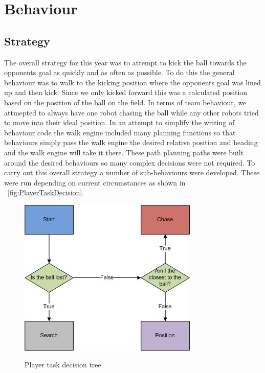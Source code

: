 \section{Behaviour}
\label{Behaviour}
\subsection{Strategy}
The overall strategy for this year was to attempt to kick the ball towards the opponents goal as quickly and as often as possible. To do this the general behaviour was to walk to the kicking position where the opponents goal was lined up and then kick. Since we only kicked forward this was a calculated position based on the position of the ball on the field. In terms of team behaviour, we attmepted to always have one robot chasing the ball while any other robots tried to move into their ideal position. In an attempt to simplify the writing of behaviour code the walk engine included many planning functions so that behaviours simply pass the walk engine the desired relative position and heading and the walk engine will take it there. These path planning paths were built around the desired behaviours so many complex decisions were not required. To carry out this overall strategy a number of sub-behaviours were developed. These were run depending on current circumstances as shown in ~\autoref{fig:PlayerTaskDecision}.

\begin{figure}[!h]
\begin{center}
   \leavevmode
    \scalebox{0.8} {\includegraphics{figs/FieldPlayerTaskDecision.jpg} }
    \caption{Player task decision tree}
    \label{fig:PlayerTaskDecision}
\end{center}
\end{figure}



